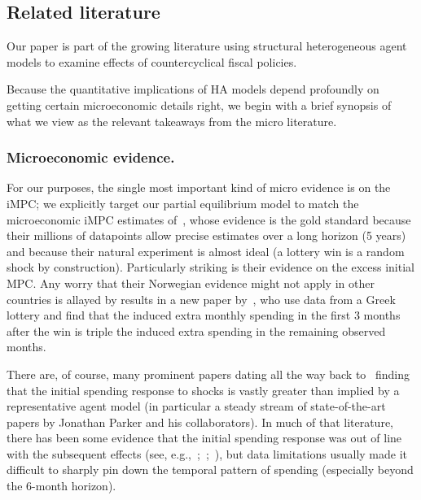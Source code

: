 \documentclass{econsocart}
\begin{document}
\whenintegrated{\label{microeconomic-literature}}\par\subsection{Related literature}
\whenintegrated{\label{sec:microlit}} %

Our paper is part of the growing literature using structural heterogeneous agent models to examine effects of countercyclical fiscal policies.

Because the quantitative implications of HA models depend profoundly on getting certain microeconomic details right, we begin with a brief synopsis of what we view as the relevant takeaways from the micro literature.

\whenintegrated{\label{microeconomic-evidence}}
\subsubsection{Microeconomic evidence.}
For our purposes, the single most important kind of micro evidence is on the iMPC; we explicitly target our partial equilibrium model to match the microeconomic iMPC estimates of~\cite{fagereng-mpc-2021}, whose evidence is the gold standard because their millions of datapoints allow precise estimates over a long horizon (5 years) and because their natural experiment is almost ideal (a lottery win is a random shock by construction).  Particularly striking is their evidence on the excess initial MPC.  Any worry that their Norwegian evidence might not apply in other countries is allayed by results in a new paper by~\cite{kotsogiannisMPCs}, who use data from a Greek lottery and find that the induced extra monthly spending in the first 3 months after the win is triple the induced extra spending in the remaining observed months.

There are, of course, many prominent papers dating all the way back to~\cite{friedmanWindfalls} finding that the initial spending response to shocks is vastly greater than implied by a representative agent model (in particular a steady stream of state-of-the-art papers by Jonathan Parker and his collaborators). In much of that literature, there has been some evidence that the initial spending response was out of line with the subsequent effects (see, e.g.,~\cite{parker2013consumer};~\cite{broda2014economic};~\cite{jpsTax}), but data limitations usually made it difficult to sharply pin down the temporal pattern of spending (especially beyond the 6-month horizon).
\end{document}
